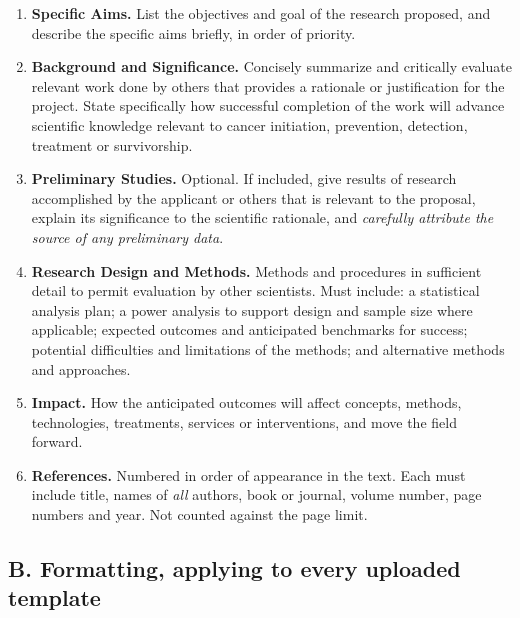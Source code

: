 \documentclass[12pt,letterpaper]{article}
\begin{document}
\begin{enumerate}
\item \textbf{Specific Aims.} List the objectives and goal of the research
  proposed, and describe the specific aims briefly, in order of priority.
\item \textbf{Background and Significance.} Concisely summarize and critically
  evaluate relevant work done by others that provides a rationale or
  justification for the project. State specifically how successful completion
  of the work will advance scientific knowledge relevant to cancer initiation,
  prevention, detection, treatment or survivorship.
\item \textbf{Preliminary Studies.} Optional. If included, give results of
  research accomplished by the applicant or others that is relevant to the
  proposal, explain its significance to the scientific rationale, and
  \emph{carefully attribute the source of any preliminary data}.
\item \textbf{Research Design and Methods.} Methods and procedures in
  sufficient detail to permit evaluation by other scientists. Must include: a
  statistical analysis plan; a power analysis to support design and sample size
  where applicable; expected outcomes and anticipated benchmarks for success;
  potential difficulties and limitations of the methods; and alternative
  methods and approaches.
\item \textbf{Impact.} How the anticipated outcomes will affect concepts,
  methods, technologies, treatments, services or interventions, and move the
  field forward.
\item \textbf{References.} Numbered in order of appearance in the text. Each
  must include title, names of \emph{all} authors, book or journal, volume
  number, page numbers and year. Not counted against the page limit.
\end{enumerate}

\subsection*{B. Formatting, applying to every uploaded template}
\end{document}
